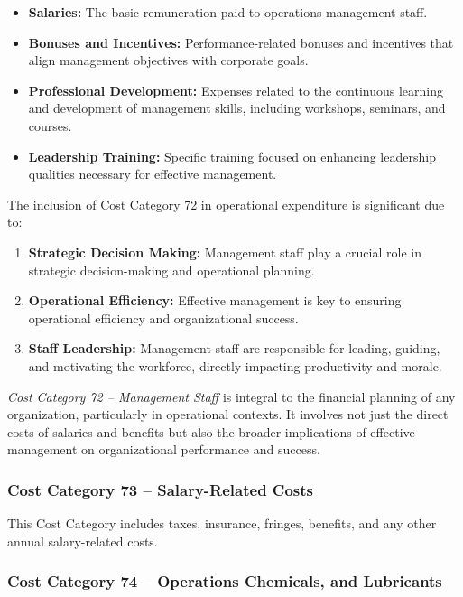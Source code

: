 \begin{itemize}
    \item \textbf{Salaries:} The basic remuneration paid to operations management staff.
    \item \textbf{Bonuses and Incentives:} Performance-related bonuses and incentives that align management objectives with corporate goals.
    \item \textbf{Professional Development:} Expenses related to the continuous learning and development of management skills, including workshops, seminars, and courses.
    \item \textbf{Leadership Training:} Specific training focused on enhancing leadership qualities necessary for effective management.
\end{itemize}

The inclusion of Cost Category 72 in operational expenditure is significant due to:

\begin{enumerate}
    \item \textbf{Strategic Decision Making:} Management staff play a crucial role in strategic decision-making and operational planning.
    \item \textbf{Operational Efficiency:} Effective management is key to ensuring operational efficiency and organizational success.
    \item \textbf{Staff Leadership:} Management staff are responsible for leading, guiding, and motivating the workforce, directly impacting productivity and morale.
\end{enumerate}

\textit{Cost Category 72 – Management Staff} is integral to the financial planning of any organization, particularly in operational contexts. It involves not just the direct costs of salaries and benefits but also the broader implications of effective management on organizational performance and success.

\subsubsection*{Cost Category 73 – Salary-Related Costs}
This Cost Category includes taxes, insurance, fringes, benefits, and any other annual salary-related costs.

\subsubsection*{Cost Category 74 – Operations Chemicals, and Lubricants}


